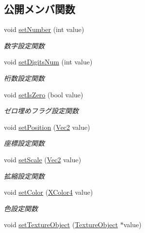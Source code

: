 \subsection*{公開メンバ関数}
\begin{DoxyCompactItemize}
\item 
void \mbox{\hyperlink{class_numbers_polygon_a63795f3d07dd587d494d36a4973426c4}{set\+Number}} (int value)
\begin{DoxyCompactList}\small\item\em 数字設定関数 \end{DoxyCompactList}\item 
void \mbox{\hyperlink{class_numbers_polygon_a288c5cc3e3146e8c6bddf8c63368f38e}{set\+Digits\+Num}} (int value)
\begin{DoxyCompactList}\small\item\em 桁数設定関数 \end{DoxyCompactList}\item 
void \mbox{\hyperlink{class_numbers_polygon_aa769b0fa962f4c3a1e0c8229e1b22e6b}{set\+Is\+Zero}} (bool value)
\begin{DoxyCompactList}\small\item\em ゼロ埋めフラグ設定関数 \end{DoxyCompactList}\item 
void \mbox{\hyperlink{class_numbers_polygon_ad7f5669e7970fa7b0f611d7448cdd5e5}{set\+Position}} (\mbox{\hyperlink{_vector3_d_8h_a5ef6e95dfc5f9d3820b71772d99bbc25}{Vec2}} value)
\begin{DoxyCompactList}\small\item\em 座標設定関数 \end{DoxyCompactList}\item 
void \mbox{\hyperlink{class_numbers_polygon_a04dd7fc8b3b20ea9c8dd5027dcf894c2}{set\+Scale}} (\mbox{\hyperlink{_vector3_d_8h_a5ef6e95dfc5f9d3820b71772d99bbc25}{Vec2}} value)
\begin{DoxyCompactList}\small\item\em 拡縮設定関数 \end{DoxyCompactList}\item 
void \mbox{\hyperlink{class_numbers_polygon_aa632bf6fb41184ac06cdf2abd24bb0ea}{set\+Color}} (\mbox{\hyperlink{_vector3_d_8h_a680c30c4a07d86fe763c7e01169cd6cc}{X\+Color4}} value)
\begin{DoxyCompactList}\small\item\em 色設定関数 \end{DoxyCompactList}\item 
void \mbox{\hyperlink{class_numbers_polygon_a154e8d7c2b9e6d08e96887c847ae3539}{set\+Texture\+Object}} (\mbox{\hyperlink{class_texture_object}{Texture\+Object}} $\ast$value)

\end{DoxyCompactItemize}
